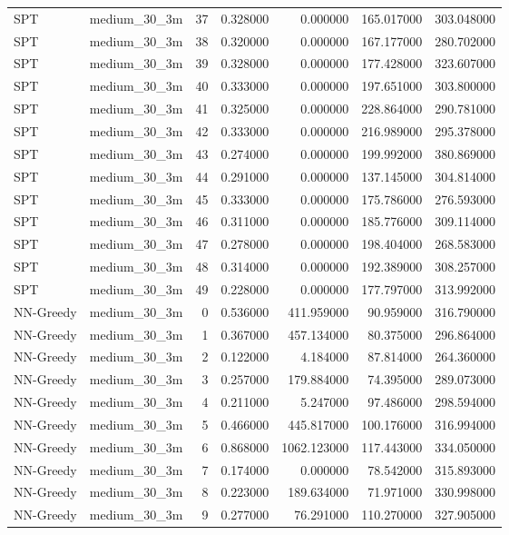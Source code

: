 \begin{tabular}{llrrrrr}
SPT & medium_30_3m & 37 & 0.328000 & 0.000000 & 165.017000 & 303.048000 \\
SPT & medium_30_3m & 38 & 0.320000 & 0.000000 & 167.177000 & 280.702000 \\
SPT & medium_30_3m & 39 & 0.328000 & 0.000000 & 177.428000 & 323.607000 \\
SPT & medium_30_3m & 40 & 0.333000 & 0.000000 & 197.651000 & 303.800000 \\
SPT & medium_30_3m & 41 & 0.325000 & 0.000000 & 228.864000 & 290.781000 \\
SPT & medium_30_3m & 42 & 0.333000 & 0.000000 & 216.989000 & 295.378000 \\
SPT & medium_30_3m & 43 & 0.274000 & 0.000000 & 199.992000 & 380.869000 \\
SPT & medium_30_3m & 44 & 0.291000 & 0.000000 & 137.145000 & 304.814000 \\
SPT & medium_30_3m & 45 & 0.333000 & 0.000000 & 175.786000 & 276.593000 \\
SPT & medium_30_3m & 46 & 0.311000 & 0.000000 & 185.776000 & 309.114000 \\
SPT & medium_30_3m & 47 & 0.278000 & 0.000000 & 198.404000 & 268.583000 \\
SPT & medium_30_3m & 48 & 0.314000 & 0.000000 & 192.389000 & 308.257000 \\
SPT & medium_30_3m & 49 & 0.228000 & 0.000000 & 177.797000 & 313.992000 \\
NN-Greedy & medium_30_3m & 0 & 0.536000 & 411.959000 & 90.959000 & 316.790000 \\
NN-Greedy & medium_30_3m & 1 & 0.367000 & 457.134000 & 80.375000 & 296.864000 \\
NN-Greedy & medium_30_3m & 2 & 0.122000 & 4.184000 & 87.814000 & 264.360000 \\
NN-Greedy & medium_30_3m & 3 & 0.257000 & 179.884000 & 74.395000 & 289.073000 \\
NN-Greedy & medium_30_3m & 4 & 0.211000 & 5.247000 & 97.486000 & 298.594000 \\
NN-Greedy & medium_30_3m & 5 & 0.466000 & 445.817000 & 100.176000 & 316.994000 \\
NN-Greedy & medium_30_3m & 6 & 0.868000 & 1062.123000 & 117.443000 & 334.050000 \\
NN-Greedy & medium_30_3m & 7 & 0.174000 & 0.000000 & 78.542000 & 315.893000 \\
NN-Greedy & medium_30_3m & 8 & 0.223000 & 189.634000 & 71.971000 & 330.998000 \\
NN-Greedy & medium_30_3m & 9 & 0.277000 & 76.291000 & 110.270000 & 327.905000 \\

\end{tabular}
